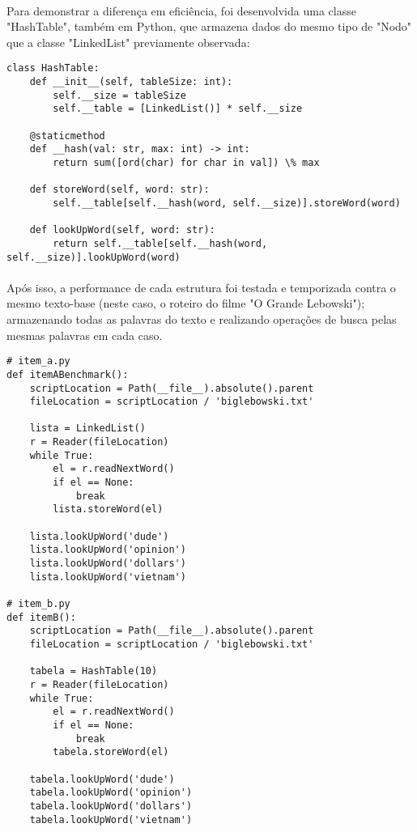 \documentclass[12pt, letterpaper]{article}
\begin{document}
\paragraph{}
Para demonstrar a diferença em eficiência, foi desenvolvida uma classe "HashTable",
também em Python, que armazena dados do mesmo tipo de "Nodo" que a classe "LinkedList"
previamente observada:

\begin{lstlisting}
class HashTable:
    def __init__(self, tableSize: int):
        self.__size = tableSize
        self.__table = [LinkedList()] * self.__size

    @staticmethod
    def __hash(val: str, max: int) -> int:
        return sum([ord(char) for char in val]) \% max

    def storeWord(self, word: str):
        self.__table[self.__hash(word, self.__size)].storeWord(word)

    def lookUpWord(self, word: str):
        return self.__table[self.__hash(word, self.__size)].lookUpWord(word)
\end{lstlisting}

\paragraph{}
Após isso, a performance de cada estrutura foi testada e temporizada contra o mesmo
texto-base (neste caso, o roteiro do filme "O Grande Lebowski"); armazenando
todas as palavras do texto e realizando operações de busca pelas mesmas palavras
em cada caso.

\begin{lstlisting}
# item_a.py
def itemABenchmark():
    scriptLocation = Path(__file__).absolute().parent
    fileLocation = scriptLocation / 'biglebowski.txt'

    lista = LinkedList()
    r = Reader(fileLocation)
    while True:
        el = r.readNextWord()
        if el == None:
            break
        lista.storeWord(el)

    lista.lookUpWord('dude')
    lista.lookUpWord('opinion')
    lista.lookUpWord('dollars')
    lista.lookUpWord('vietnam')

# item_b.py
def itemB():
    scriptLocation = Path(__file__).absolute().parent
    fileLocation = scriptLocation / 'biglebowski.txt'

    tabela = HashTable(10)
    r = Reader(fileLocation)
    while True:
        el = r.readNextWord()
        if el == None:
            break
        tabela.storeWord(el)

    tabela.lookUpWord('dude')
    tabela.lookUpWord('opinion')
    tabela.lookUpWord('dollars')
    tabela.lookUpWord('vietnam')
\end{lstlisting}
\end{document}
